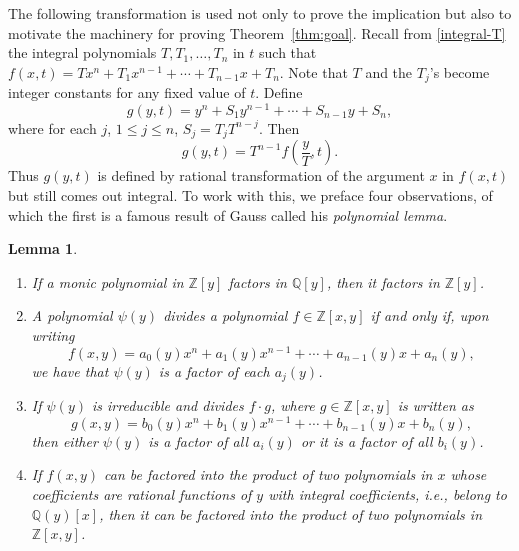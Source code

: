 \documentclass{article}
\theoremstyle{plain}
\newtheorem{lemma}[thm]{Lemma}
\theoremstyle{definition}
\renewcommand{\leq}{\leqslant}  %
\newcommand{\Que}{\mathbb{Q}}   %
\newcommand{\Zed}{\mathbb{Z}}   %
\begin{document}
The following transformation is used not only to prove the implication but also to motivate the machinery for proving Theorem~\ref{thm:goal}.
Recall from \eqref{integral-T} the integral polynomials $T,T_1,\dots,T_n$ in $t$ such that
$f(x,t) = Tx^n + T_1 x^{n-1} + \cdots +T_{n-1} x + T_n.$
Note that $T$ and the $T_j$'s become integer constants for any fixed value of $t$.  Define
%
\begin{equation}\label{gyt}
g(y,t) = y^n + S_1 y^{n-1} + \cdots + S_{n-1} y + S_n,
\end{equation}
%
where for each $j$, $1 \leq j \leq n$, $S_j = T_j T^{n-j}$.  Then
\[
g(y,t) = T^{n-1} f(\frac{y}{T},t).
\]
Thus $g(y,t)$ is defined by rational transformation of the argument $x$ in $f(x,t)$
but still comes out integral.  To work with this, we preface four observations,
of which the first is a famous result of Gauss called his \emph{polynomial lemma}.


\begin{lemma} %
\label{lem:factors}
\begin{enumerate}
\item %
If a monic polynomial in $\Zed[y]$ factors in $\Que[y]$, then it factors in $\Zed[y]$.
\item %
A polynomial $\psi(y)$ divides a polynomial $f \in \Zed[x,y]$ if and only if, upon writing
\[
f(x,y) = a_0(y)x^{n} + a_1(y)x^{n-1} +\cdots+ a_{n-1}(y)x + a_n(y),
\]
we have that $\psi(y)$ is a factor of each $a_j(y)$.
\item %
If $\psi(y)$ is irreducible and divides $f\cdot g$, where $g \in \Zed[x,y]$ is written as
\[
g(x,y) = b_0(y)x^{n} + b_1(y)x^{n-1} +\cdots+ b_{n-1}(y)x + b_n(y),
\]
then either $\psi(y)$ is a factor of all $a_i(y)$ or it is a factor of all $b_i(y)$.
\item %
If $f(x,y)$ can be factored into the product of two polynomials in $x$
whose coefficients are rational functions of $y$ with integral
coefficients, i.e., belong to $\Que(y)[x]$, then it can be factored into the
product of two polynomials in $\Zed[x,y]$.
\end{enumerate}
\end{lemma}
\end{document}
